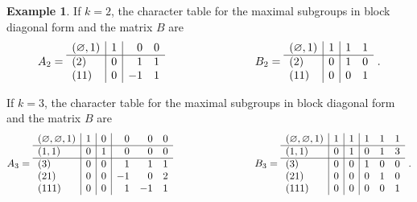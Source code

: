 \documentclass[10pt]{amsart}
\theoremstyle{definition}
\newtheorem{example}[theorem]{Example}
\theoremstyle{remark}
\newcommand{\epart}{\text{\footnotesize$\varnothing$}}
\begin{document}
\begin{example} \label{Ex:firstfactorization}
If $k = 2$, the character table for the maximal
subgroups in block diagonal form and the matrix
$B$ are
$$
A_2 = \begin{array}{l|r|rr}
(\epart,1) & 1 & 0 & 0\\
\hline
(2) & 0 & 1 & 1\\
(11) & 0 & -1 & 1
\end{array}
\qquad\qquad\qquad\qquad
B_2 = \begin{array}{l|r|rr}
(\epart,1) & 1 & 1 & 1\\
\hline
(2) & 0 & 1 & 0\\
(11) & 0 & 0 & 1
\end{array}~.
$$

If $k = 3$, the character table for the maximal
subgroups in block diagonal form and the matrix
$B$ are
$$
A_3 = \begin{array}{l|r|r|rrr}
(\epart, \epart, 1) & 1 & 0 & 0 & 0 & 0\\
\hline
(1, 1) & 0 & 1 & 0 & 0 & 0\\
\hline
(3) & 0 & 0 & 1 & 1 & 1\\
(21) & 0 & 0 & -1 & 0 & 2\\
(111) & 0 & 0 & 1 & -1 & 1
\end{array}
\qquad\qquad\qquad\qquad
B_3 = \begin{array}{l|r|r|rrr}
(\epart, \epart, 1) & 1 & 1 & 1 & 1 & 1\\
\hline
(1, 1) & 0 & 1 & 0 & 1 & 3\\
\hline
(3) & 0 & 0 & 1 & 0 & 0\\
(21) & 0 & 0 & 0 & 1 & 0\\
(111) & 0 & 0 & 0 & 0 & 1
\end{array}~.
$$


\end{example}
\end{document}
